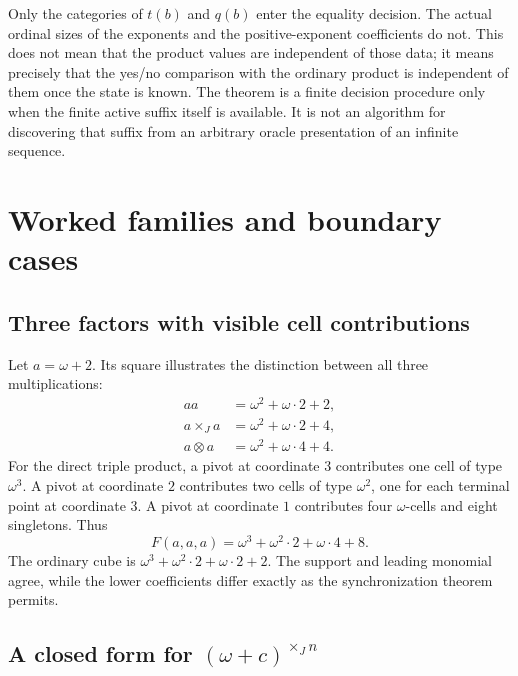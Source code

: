 \documentclass[11pt,letterpaper]{article}
\theoremstyle{definition}
\theoremstyle{remark}
\newcommand{\J}{\mathbin{\times_{\!J}}}
\begin{document}
Only the categories of $t(b)$ and $q(b)$ enter the equality decision.
The actual ordinal sizes of the exponents and the positive-exponent
coefficients do not. This does not mean that the product values are
independent of those data; it means precisely that the yes/no comparison
with the ordinary product is independent of them once the state is known.
The theorem is a finite decision procedure only when the finite active
suffix itself is available. It is not an algorithm for discovering that
suffix from an arbitrary oracle presentation of an infinite sequence.

\section{Worked families and boundary cases}\label{sec:examples}

\subsection{Three factors with visible cell contributions}

Let $a=\omega+2$. Its square illustrates the distinction between all
three multiplications:
\begin{align*}
 aa&=\omega^2+\omega\cdot2+2,\\
 a\J a&=\omega^2+\omega\cdot2+4,\\
 a\otimes a&=\omega^2+\omega\cdot4+4.
\end{align*}
For the direct triple product, a pivot at coordinate $3$ contributes
one cell of type $\omega^3$. A pivot at coordinate $2$ contributes two
cells of type $\omega^2$, one for each terminal point at coordinate $3$.
A pivot at coordinate $1$ contributes four $\omega$-cells and eight
singletons. Thus
\begin{equation}\label{eq:a-cube}
 F(a,a,a)=\omega^3+\omega^2\cdot2+\omega\cdot4+8.
\end{equation}
The ordinary cube is
$\omega^3+\omega^2\cdot2+\omega\cdot2+2$. The support and leading
monomial agree, while the lower coefficients differ exactly as the
synchronization theorem permits.

\subsection{A closed form for \texorpdfstring{$(\omega+c)^{\J n}$}{finite Jacobsthal powers of omega+c}}
\end{document}
